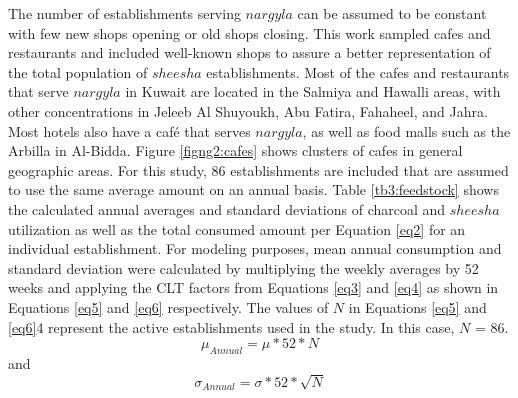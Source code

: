 The number of establishments serving $nargyla$ can be assumed to be constant with few new shops opening or old shops closing.  This work sampled cafes and restaurants and included well-known shops to assure a better representation of the total population of $sheesha$ establishments.   Most of the cafes and restaurants that serve $nargyla$ in Kuwait are located in the Salmiya and Hawalli areas, with other concentrations in Jeleeb Al Shuyoukh, Abu Fatira, Fahaheel, and Jahra.  Most hotels also have a caf\'e that serves $nargyla$, as well as food malls such as the Arbilla in Al-Bidda.  Figure \ref{figng2:cafes} shows clusters of cafes in general geographic areas.  For this study, 86 establishments are included that are assumed to use the same average amount on an annual basis.  Table \ref{tb3:feedstock} shows the calculated annual averages and standard deviations of charcoal and $sheesha$ utilization as well as the total consumed amount per Equation \ref{eq2} for an individual establishment.  For modeling purposes, mean annual consumption and standard deviation were calculated by multiplying the weekly averages by 52 weeks and applying the CLT factors from Equations \ref{eq3} and \ref{eq4} as shown in Equations \ref{eq5} and \ref{eq6} respectively.  The values of $N$ in Equations \ref{eq5} and \ref{eq6}4 represent the active establishments used in the study.  In this case, $N$ = 86.
%
\begin{equation}
\label{eq5}
\mu_{Annual}= \mu*52*N
\end{equation}
%
\noindent
and 
%
\begin{equation}
\label{eq6}
\sigma_{Annual}= \sigma*52*\sqrt{N}
\end{equation}
%
\noindent

%
\begin{table}[H]
\centering
\caption[Feedstock inputs for individual establishments and total annual consumption]{Feedstock inputs (in kgs) for individual establishments and total annual consumption}
\label{tb3:feedstock}
\end{table}
%

